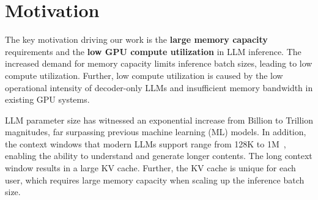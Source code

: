 \section{Motivation}

The key motivation driving our work is the \textbf{large memory capacity} requirements and the \textbf{low GPU compute utilization} in LLM inference. The increased demand for memory capacity limits inference batch sizes, leading to low compute utilization. Further, low compute utilization is caused by the low operational intensity of decoder-only LLMs and insufficient memory bandwidth in existing GPU systems.

LLM parameter size has witnessed an exponential increase from Billion to Trillion magnitudes, far surpassing previous machine learning (ML) models. In addition, the context windows that modern LLMs support range from 128K to 1M~\cite{gpt4-turbo, gemini-pro}, enabling the ability to understand and generate longer contents.
The long context window results in a large KV cache. Further, the KV cache is unique for each user, which requires large memory capacity when scaling up the inference batch size. 

